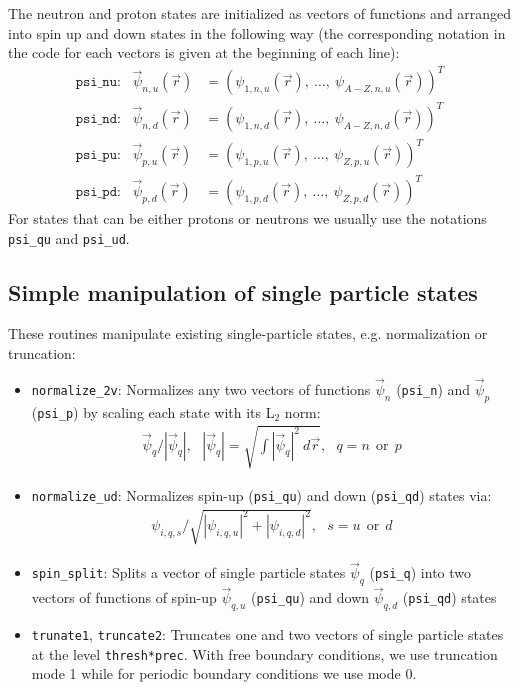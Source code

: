 \documentclass[3p]{elsarticle}
\begin{document}
The neutron and proton states are initialized as vectors of functions and arranged into spin up and down states in the following way (the corresponding notation in the code for each vectors is given at the beginning of each line):
\begin{align}
 \texttt{psi\_nu}: \:\:\: \vec{\psi}_{n,u} (\vec{r}) &= \left( \psi_{1,n,u} (\vec{r}), \:  \dots,  \: \psi_{A-Z,n,u} (\vec{r}) \right)^T\\
 \texttt{psi\_nd}: \:\:\: \vec{\psi}_{n,d} (\vec{r}) &= \left( \psi_{1,n,d} (\vec{r}), \:  \dots,  \: \psi_{A-Z,n,d} (\vec{r}) \right)^T \\
\texttt{psi\_pu}: \:\:\: \vec{\psi}_{p,u} (\vec{r}) &= \left( \psi_{1,p,u} (\vec{r}), \:  \dots,  \: \psi_{Z,p,u} (\vec{r}) \right)^T \\
\texttt{psi\_pd}: \:\:\:  \vec{\psi}_{p,d} (\vec{r}) &= \left( \psi_{1,p,d} (\vec{r}), \:  \dots,  \: \psi_{Z,p,d} (\vec{r}) \right)^T 
\end{align}
For states that can be either protons or neutrons we usually use the notations \texttt{psi\_qu} and \texttt{psi\_ud}.   
\subsection{Simple manipulation of single particle states}
These routines manipulate existing single-particle states, e.g. normalization or truncation:
\begin{itemize}
\item \texttt{normalize\_2v}: Normalizes any two vectors of functions $\vec{\psi}_n$ (\texttt{psi\_n}) and $\vec{\psi}_p$ (\texttt{psi\_p}) by scaling each state with its L$_2$ norm:
\begin{align}
\vec{\psi}_{q} / | \vec{\psi}_q |, \: \: \: | \vec{\psi}_q | = \sqrt{\int | \vec{\psi}_q |^2 \: d \vec{r}}, \:\:\: q = n \:\:\mathrm{or} \:\:  p
\end{align}
\item \texttt{normalize\_ud}: Normalizes spin-up (\texttt{psi\_qu}) and down (\texttt{psi\_qd}) states via: 
\begin{align}
\psi_{i,q,s}  / \sqrt{ | \psi_{i,q,u} |^2 +  | \psi_{i,q,d} |^2 } , \: \: \: s = u \:\:\mathrm{or} \:\:  d
\end{align}
\item \texttt{spin\_split}: Splits a vector of single particle states $\vec{\psi}_q$ (\texttt{psi\_q}) into two vectors of functions of spin-up $\vec{\psi}_{q,u}$ (\texttt{psi\_qu}) and down $\vec{\psi}_{q,d}$ (\texttt{psi\_qd}) states 
\item \texttt{trunate1}, \texttt{truncate2}: Truncates one and two vectors of single particle states at the level \texttt{thresh*prec}. With free boundary conditions, we use truncation mode 1 while for periodic 
boundary conditions we use mode 0. 
\end{itemize}
\end{document}
